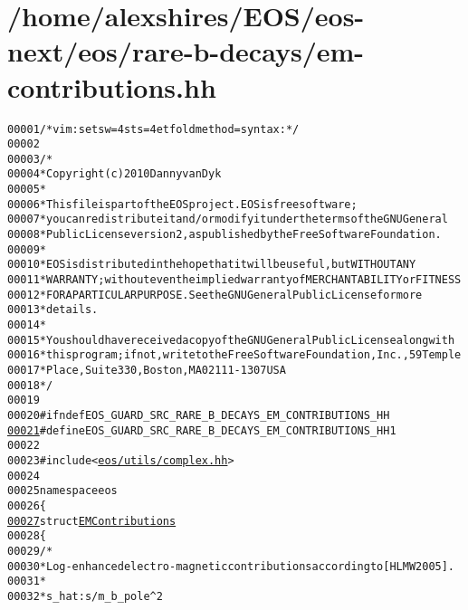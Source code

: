 \hypertarget{em-contributions_8hh_source}{
\section{/home/alexshires/EOS/eos-\/next/eos/rare-\/b-\/decays/em-\/contributions.hh}
}


\begin{footnotesize}\begin{alltt}
00001 \textcolor{comment}{/* vim: set sw=4 sts=4 et foldmethod=syntax : */}
00002 
00003 \textcolor{comment}{/*}
00004 \textcolor{comment}{ * Copyright (c) 2010 Danny van Dyk}
00005 \textcolor{comment}{ *}
00006 \textcolor{comment}{ * This file is part of the EOS project. EOS is free software;}
00007 \textcolor{comment}{ * you can redistribute it and/or modify it under the terms of the GNU General}
00008 \textcolor{comment}{ * Public License version 2, as published by the Free Software Foundation.}
00009 \textcolor{comment}{ *}
00010 \textcolor{comment}{ * EOS is distributed in the hope that it will be useful, but WITHOUT ANY}
00011 \textcolor{comment}{ * WARRANTY; without even the implied warranty of MERCHANTABILITY or FITNESS}
00012 \textcolor{comment}{ * FOR A PARTICULAR PURPOSE.  See the GNU General Public License for more}
00013 \textcolor{comment}{ * details.}
00014 \textcolor{comment}{ *}
00015 \textcolor{comment}{ * You should have received a copy of the GNU General Public License along with}
00016 \textcolor{comment}{ * this program; if not, write to the Free Software Foundation, Inc., 59 Temple}
00017 \textcolor{comment}{ * Place, Suite 330, Boston, MA  02111-1307  USA}
00018 \textcolor{comment}{ */}
00019 
00020 \textcolor{preprocessor}{#ifndef EOS\_GUARD\_SRC\_RARE\_B\_DECAYS\_EM\_CONTRIBUTIONS\_HH}
\hypertarget{em-contributions_8hh_source_l00021}{}\hyperlink{em-contributions_8hh_a40ecb972bc9ffd4d87f689f41aa2b683}{00021} \textcolor{preprocessor}{}\textcolor{preprocessor}{#define EOS\_GUARD\_SRC\_RARE\_B\_DECAYS\_EM\_CONTRIBUTIONS\_HH 1}
00022 \textcolor{preprocessor}{}
00023 \textcolor{preprocessor}{#include <\hyperlink{complex_8hh}{eos/utils/complex.hh}>}
00024 
00025 \textcolor{keyword}{namespace }eos
00026 \{
\hypertarget{em-contributions_8hh_source_l00027}{}\hyperlink{structeos_1_1EMContributions}{00027}     \textcolor{keyword}{struct }\hyperlink{structeos_1_1EMContributions}{EMContributions}
00028     \{
00029         \textcolor{comment}{/*}
00030 \textcolor{comment}{         * Log-enhanced electro-magnetic contributions according to [HLMW2005].}
00031 \textcolor{comment}{         *}
00032 \textcolor{comment}{         * s\_hat:       s / m\_b\_pole^2}

\end{alltt}
\end{footnotesize}

